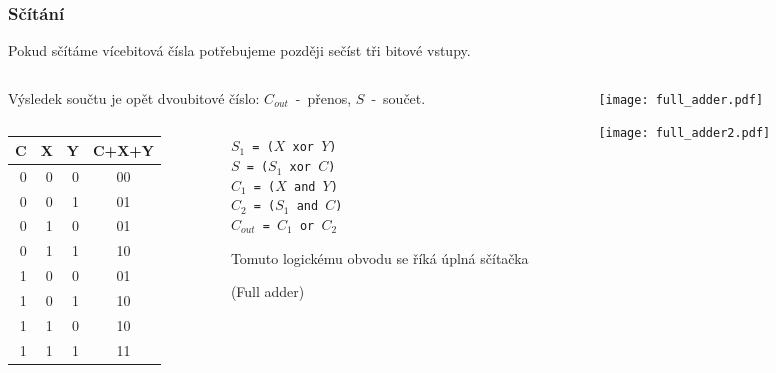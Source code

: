 \documentclass{beamer}
\begin{document}
\begin{frame}
\frametitle{Sčítání}

Pokud sčítáme vícebitová čísla potřebujeme později sečíst tři bitové vstupy.

\begin{columns}
\begin{column}{0.6\textwidth}
Výsledek součtu je opět dvoubitové číslo: $C_{out}$~-~přenos, $S$~-~součet.

\begin{columns}
\begin{column}{0.55\textwidth}

\bigskip

\begin{tabular}{|r|r|r|c|}\hline
C & X & Y & C+X+Y\\ \hline
0 & 0 & 0 & 00\\ \hline
0 & 0 & 1 & 01\\ \hline
0 & 1 & 0 & 01\\ \hline
0 & 1 & 1 & 10\\ \hline
1 & 0 & 0 & 01\\ \hline
1 & 0 & 1 & 10\\ \hline
1 & 1 & 0 & 10\\ \hline
1 & 1 & 1 & 11\\ \hline
\end{tabular}

\end{column}
\begin{column}{0.45\textwidth}

\texttt{$S_1$ = ($X$ xor $Y$)}\\
\texttt{$S$ = ($S_1$ xor $C$)}\\
\texttt{$C_1$ = ($X$ and $Y$)}\\
\texttt{$C_2$ = ($S_1$ and $C$)}\\
\texttt{$C_{out}$ = $C_1$ or $C_2$}

\bigskip

Tomuto logickému obvodu se říká úplná sčítačka 

(Full adder)
\end{column}
\end{columns}

\end{column}
\begin{column}{0.4\textwidth}  

\begin{center}
   \texttt{[image: full\_adder.pdf]}
\end{center}


\begin{center}
   \texttt{[image: full\_adder2.pdf]}
\end{center}

\end{column}
\end{columns}


\end{frame}
\end{document}
